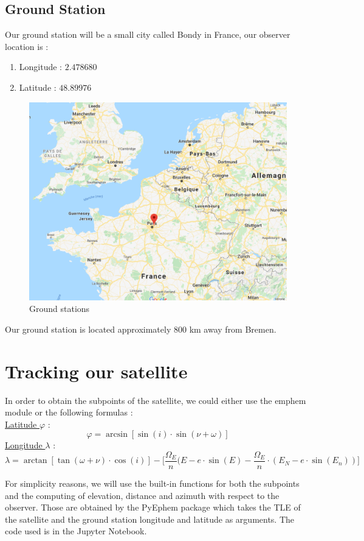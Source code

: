 \documentclass[a4paper,12pt,calibri,oneside,openany]{book}
\theoremstyle{break}
\begin{document}
\section{Ground Station}
Our ground station will be a small city called Bondy in France, our observer location is :
\begin{enumerate}
	\item Longitude : $2.478680$
	\item Latitude : $48.89976$
\end{enumerate}
\begin{figure}[h]
	\centering
	\includegraphics[width=14cm]{bondy}
	\caption{Ground stations }
	\label{Ground Station}
\end{figure}

Our ground station is located approximately $800$ km away from Bremen.
\chapter{Tracking our satellite}
In order to obtain the subpoints of the satellite, we could either use the emphem module or the following formulas : \\
\underline{Latitude $\varphi$} :
$$
\varphi = \arcsin[\sin(i)\cdot \sin(\nu + \omega)]
$$
\underline{Longitude $\lambda$} :
$$
\lambda = \arctan[\tan(\omega + \nu)\cdot \cos(i)] - \bigg[\frac{\Omega_E}n (E-e\cdot\sin(E) - \frac{\Omega_E}{n}\cdot (E_N - e\cdot\sin(E_n))\bigg]
$$

For simplicity reasons, we will use the built-in functions for both the subpoints and the computing of elevation, distance and azimuth with respect to the observer. Those are obtained by the PyEphem package which takes the TLE of the satellite and the ground station longitude and latitude as arguments. The code used is in the Jupyter Notebook.
\end{document}

